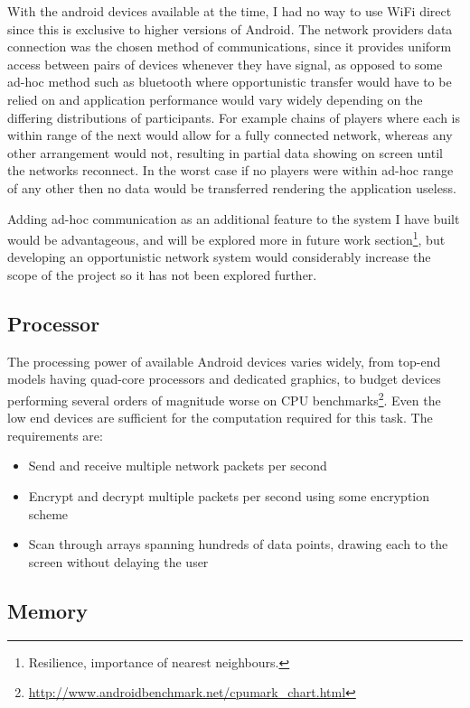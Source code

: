 With the android devices available at the time, I had no way to use WiFi direct since this is exclusive to higher versions of Android. The network providers data connection was the chosen method of communications, since it provides uniform access between pairs of devices whenever they have signal, as opposed to some ad-hoc method such as bluetooth where opportunistic transfer would have to be relied on and application performance would vary widely depending on the differing distributions of participants. For example chains of players where each is within range of the next would allow for a fully connected network, whereas any other arrangement would not, resulting in partial data showing on screen until the networks reconnect. In the worst case if no players were within ad-hoc range of any other then no data would be transferred rendering the application useless.

Adding ad-hoc communication as an additional feature to the system I have built would be advantageous, and will be explored more in future work section\footnote{Resilience, importance of nearest neighbours.}, but developing an opportunistic network system would considerably increase the scope of the project so it has not been explored further.

\subsection{Processor}

The processing power of available Android devices varies widely, from top-end models having quad-core processors and dedicated graphics, to budget devices performing several orders of magnitude worse on CPU benchmarks\footnote{\url{http://www.androidbenchmark.net/cpumark_chart.html}}. Even the low end devices are sufficient for the computation required for this task. The requirements are:
\begin{itemize}
\item{Send and receive multiple network packets per second}
\item{Encrypt and decrypt multiple packets per second using some encryption scheme}
\item{Scan through arrays spanning hundreds of data points, drawing each to the screen without delaying the user}
\end{itemize}

\subsection{Memory}

